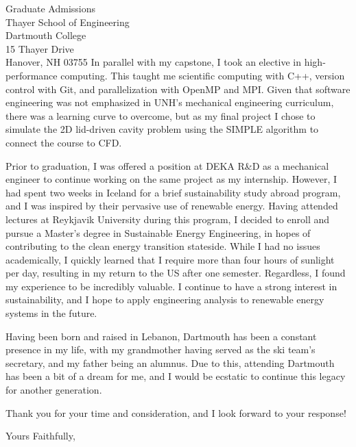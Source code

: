 \documentclass{letter}
\begin{document}
\begin{letter}{Graduate Admissions \\ Thayer School of Engineering \\ Dartmouth College \\ 15 Thayer Drive \\ Hanover, NH 03755}
    In parallel with my capstone, I took an elective in high-performance computing. 
    This taught me scientific computing with C++, version control with Git, and 
    parallelization with OpenMP and MPI. Given that software engineering was not 
    emphasized in UNH's mechanical engineering curriculum, there was a learning 
    curve to overcome, but as my final project I chose to simulate the 2D 
    lid-driven cavity problem using the SIMPLE algorithm to connect the course to CFD.

    Prior to graduation, I was offered a position at DEKA R\&D as a mechanical 
    engineer to continue working on the same project as my internship. However, 
    I had spent two weeks in Iceland for a brief sustainability study abroad 
    program, and I was inspired by their pervasive use of renewable energy. 
    Having attended lectures at Reykjavik University during this program, I 
    decided to enroll and pursue a Master's degree in Sustainable Energy 
    Engineering, in hopes of contributing to the clean energy transition 
    stateside. While I had no issues academically, I quickly learned that I 
    require more than four hours of sunlight per day, resulting in my return 
    to the US after one semester. Regardless, I found my experience to be 
    incredibly valuable. I continue to have a strong interest in sustainability, 
    and I hope to apply engineering analysis to renewable energy systems in the future.

    Having been born and raised in Lebanon, Dartmouth has been a constant presence 
    in my life, with my grandmother having served as the ski team's secretary, and 
    my father being an alumnus. Due to this, attending Dartmouth has been a bit of 
    a dream for me, and I would be ecstatic to continue this legacy for another generation.

    Thank you for your time and consideration, and I look forward to your response!

    \closing{Yours Faithfully,}

\end{letter}
\end{document}
